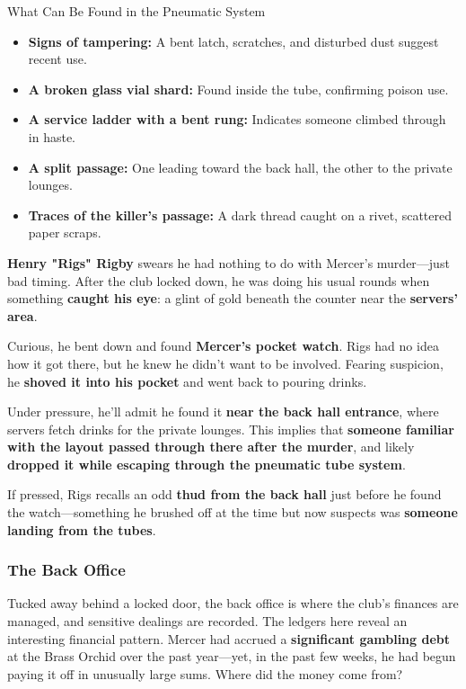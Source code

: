 \begin{CommentBox}{What Can Be Found in the Pneumatic System}  
	\begin{itemize}
		\item \textbf{Signs of tampering:} A bent latch, scratches, and disturbed dust suggest recent use.
		\item \textbf{A broken glass vial shard:} Found inside the tube, confirming poison use.
		\item \textbf{A service ladder with a bent rung:} Indicates someone climbed through in haste.
		\item \textbf{A split passage:} One leading toward the back hall, the other to the private lounges.
		\item \textbf{Traces of the killer’s passage:} A dark thread caught on a rivet, scattered paper scraps.
	\end{itemize}
\end{CommentBox}


\begin{Example}
	\textbf{Henry "Rigs" Rigby} swears he had nothing to do with Mercer’s murder—just bad timing. After the club locked down, he was doing his usual rounds when something \textbf{caught his eye}: a glint of gold beneath the counter near the \textbf{servers’ area}.

	Curious, he bent down and found \textbf{Mercer’s pocket watch}. Rigs had no idea how it got there, but he knew he didn’t want to be involved. Fearing suspicion, he \textbf{shoved it into his pocket} and went back to pouring drinks.
	
	Under pressure, he’ll admit he found it \textbf{near the back hall entrance}, where servers fetch drinks for the private lounges. This implies that \textbf{someone familiar with the layout passed through there after the murder}, and likely \textbf{dropped it while escaping through the pneumatic tube system}.
	
	If pressed, Rigs recalls an odd \textbf{thud from the back hall} just before he found the watch—something he brushed off at the time but now suspects was \textbf{someone landing from the tubes}.
\end{Example}  

\newcolumn

\subsubsection{The Back Office}  
Tucked away behind a locked door, the back office is where the club’s finances are managed, and sensitive dealings are recorded. The ledgers here reveal an interesting financial pattern. Mercer had accrued a \textbf{significant gambling debt} at the Brass Orchid over the past year—yet, in the past few weeks, he had begun paying it off in unusually large sums. Where did the money come from?  

